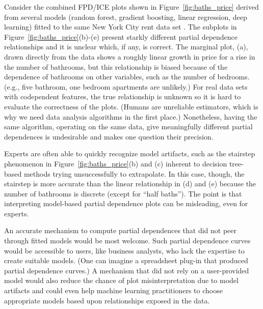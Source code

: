 \documentclass[]{article} %
\newcommand{\figref}[1]{Figure~\ref{#1}}
\begin{document}
Consider the combined FPD/ICE plots shown in \figref{fig:baths_price} derived from several models (random forest, gradient boosting, linear regression, deep learning) fitted to the same New York City rent data set \citep{rent}.  The subplots in \figref{fig:baths_price}(b)-(e)  present starkly different partial dependence relationships and it is unclear which, if any, is correct.  The marginal plot, (a), drawn directly from the data shows a roughly linear growth in price for a rise in the number of bathrooms, but this relationship is biased because of the dependence of bathrooms on other variables, such as the number of bedrooms. (e.g., five bathroom, one bedroom apartments are unlikely.)  For real data sets with codependent features, the true relationship is unknown so it is hard to evaluate the correctness of the plots. (Humans are unreliable estimators, which is why we need data analysis algorithms in the first place.) Nonetheless, having the same algorithm, operating on the same data, give meaningfully different partial dependences is undesirable and makes one question their  precision.

Experts are often able to quickly recognize model artifacts, such as the  stairstep phenomenon in \figref{fig:baths_price}(b) and (c) inherent to decision tree-based methods trying unsuccessfully to extrapolate.  In this case, though, the stairstep is more accurate than the linear relationship in (d) and (e) because the number of bathrooms is discrete (except for ``half baths'').  The point is that interpreting model-based partial dependence plots can be misleading, even for experts. 

An accurate mechanism to compute partial dependences that did not peer through fitted models would be most welcome.  Such partial dependence curves would be accessible to users, like business analysts, who lack the expertise to create suitable models. (One can imagine a spreadsheet plug-in that produced partial dependence curves.) A mechanism that did not rely on a user-provided model would also reduce the chance of plot misinterpretation due to model artifacts and could even help machine learning practitioners to choose appropriate models based upon relationships exposed in the data.
\end{document}
